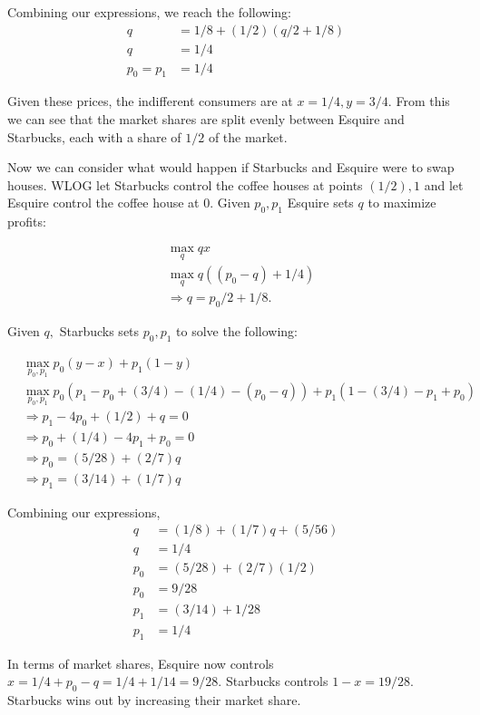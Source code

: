 \documentclass[11pt]{article} %
\begin{document}
Combining our expressions, we reach the following:
\begin{align*}
q &= 1/8 + (1/2)(q/2 + 1/8)\\
q &= 1/4\\
p_0 = p_1 &= 1/4
\end{align*}

Given these prices, the indifferent consumers are at $x = 1/4, y = 3/4$. From this we can see that the market shares are split evenly between Esquire and Starbucks, each with a share of $1/2$ of the market.

Now we can consider what would happen if Starbucks and Esquire were to swap houses. WLOG let Starbucks control the coffee houses at points $(1/2),1$ and let Esquire control the coffee house at $0$. Given $p_0,p_1$ Esquire sets $q$ to maximize profits:

\begin{align*}
&\max_{q} qx\\
&\max_{q} q((p_0 - q) + 1/4)\\
&\Rightarrow q = p_0/2 + 1/8.
\end{align*}

Given $q,$ Starbucks sets $p_0,p_1$ to solve the following:

\begin{align*}
&\max_{p_0,p_1} p_0(y-x) + p_1(1-y)\\
&\max_{p_0,p_1} p_0(p_1 - p_0 + (3/4) - (1/4) - (p_0 - q)) + p_1(1 - (3/4) - p_1 + p_0)\\
&\Rightarrow p_1 - 4p_0 + (1/2) + q  = 0 \\
&\Rightarrow p_0  + (1/4) - 4p_1 + p_0 = 0  \\
&\Rightarrow p_0 = (5/28) + (2/7)q \\
&\Rightarrow p_1 = (3/14) + (1/7)q
\end{align*}

Combining our expressions,
\begin{align*}
q &= (1/8) + (1/7)q + (5/56)\\
q &= 1/4 \\
p_0 &= (5/28) + (2/7)(1/2) \\
p_0 &= 9/28\\
p_1 &= (3/14) + 1/28 \\
p_1 &= 1/4
\end{align*}

In terms of market shares, Esquire now controls $x = 1/4 + p_0 - q = 1/4 + 1/14 = 9/28$. Starbucks controls $1-x = 19/28$. Starbucks wins out by increasing their market share.
\end{document}
